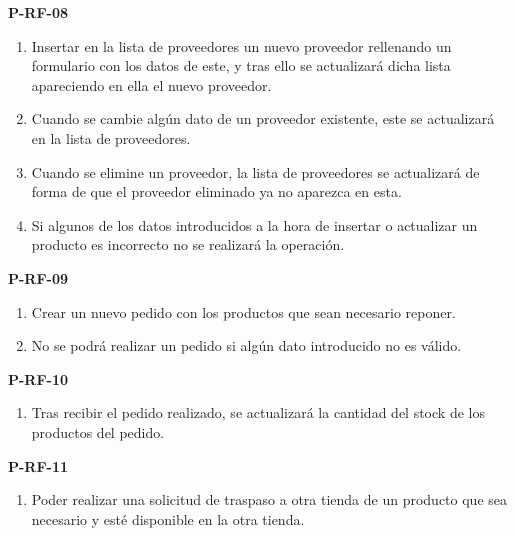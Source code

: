 \textbf{P-RF-08}
\begin{enumerate}
	\item Insertar en la lista de proveedores un nuevo proveedor rellenando un formulario con los datos de este, y tras ello se actualizará dicha lista apareciendo en ella el nuevo proveedor.
	\item Cuando se cambie algún dato de un proveedor existente, este se actualizará en la lista de proveedores.
	\item Cuando se elimine un proveedor, la lista de proveedores se actualizará de forma de que el proveedor eliminado ya no aparezca en esta.
	\item Si algunos de los datos introducidos a la hora de insertar o actualizar un producto es incorrecto no se realizará la operación.
\end{enumerate}

\textbf{P-RF-09}
\begin{enumerate}
	\item Crear un nuevo pedido con los productos que sean necesario reponer.
	\item No se podrá realizar un pedido si algún dato introducido no es válido.
\end{enumerate}

\textbf{P-RF-10}
\begin{enumerate}
	\item Tras recibir el pedido realizado, se actualizará la cantidad del stock de los productos del pedido.
\end{enumerate}

\textbf{P-RF-11}
\begin{enumerate}
	\item Poder realizar una solicitud de traspaso a otra tienda de un producto que sea necesario y esté disponible en la otra tienda.
\end{enumerate}

